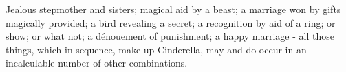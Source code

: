 Jealous stepmother and sisters; magical aid by a beast; a marriage won by gifts magically provided; a bird revealing a secret; a recognition by aid of a ring; or show; or what not; a dénouement of punishment; a happy marriage - all those things, which in sequence, make up Cinderella, may and do occur in an incalculable number of other combinations.